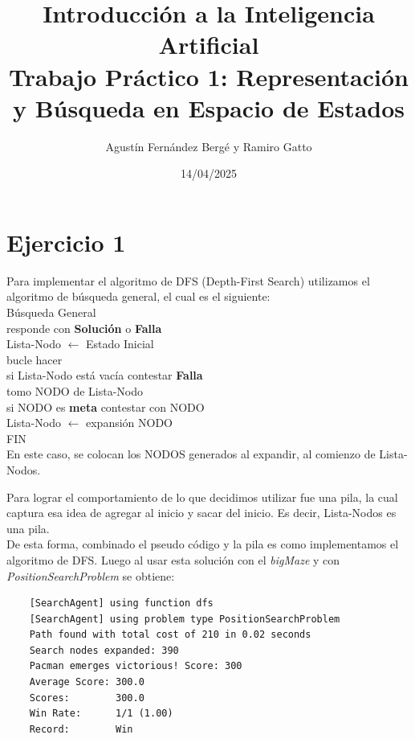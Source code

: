 \documentclass[12pt, titlepage, a4paper]{article}
\title{Introducción a la Inteligencia Artificial \\
Trabajo Práctico 1: Representación y Búsqueda en Espacio de Estados }
\author{Agustín Fernández Bergé y Ramiro Gatto}
\date{14/04/2025}
\begin{document}
\maketitle

\section{Ejercicio 1}
Para implementar el algoritmo de DFS (Depth-First Search) utilizamos 
el algoritmo de búsqueda general, el cual es el siguiente:\\ 

\noindent Búsqueda General\\
\indent responde con \textbf{Solución} o \textbf{Falla}\\
\indent Lista-Nodo $\leftarrow$ Estado Inicial\\

\noindent bucle hacer\\
\indent si Lista-Nodo está vacía contestar \textbf{Falla}\\
\indent tomo NODO de Lista-Nodo\\
\indent si NODO es \textbf{meta} contestar con NODO\\
\indent Lista-Nodo $\leftarrow$ expansión NODO\\
\noindent FIN\\

En este caso, se colocan los NODOS generados al expandir, al comienzo de Lista-Nodos. 

Para lograr el comportamiento de  lo que  
decidimos utilizar fue una pila, la cual captura esa idea de agregar al inicio y sacar del inicio. 
Es decir, Lista-Nodos es una pila.\\

De esta forma, combinado el pseudo código y la pila es como implementamos 
el algoritmo de DFS. Luego al usar esta solución con el \textit{bigMaze} 
y con \textit{PositionSearchProblem} se obtiene:
\begin{verbatim}
    [SearchAgent] using function dfs
    [SearchAgent] using problem type PositionSearchProblem
    Path found with total cost of 210 in 0.02 seconds
    Search nodes expanded: 390
    Pacman emerges victorious! Score: 300
    Average Score: 300.0
    Scores:        300.0
    Win Rate:      1/1 (1.00)
    Record:        Win
\end{verbatim}

\end{document}
